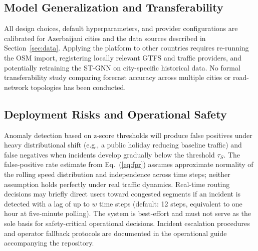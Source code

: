 \subsection{Model Generalization and Transferability}

All design choices, default hyperparameters, and provider configurations
are calibrated for Azerbaijani cities and the data sources described in
Section~\ref{sec:data}.
Applying the platform to other countries requires re-running the OSM
import, registering locally relevant GTFS and traffic providers, and
potentially retraining the ST-GNN on city-specific historical data.
No formal transferability study comparing forecast accuracy across
multiple cities or road-network topologies has been conducted.

\subsection{Deployment Risks and Operational Safety}

Anomaly detection based on z-score thresholds will produce false positives
under heavy distributional shift (e.g., a public holiday reducing baseline
traffic) and false negatives when incidents develop gradually below the
threshold $\tau_S$.
The false-positive rate estimate from Eq.~(\ref{eq:fpr}) assumes approximate
normality of the rolling speed distribution and independence across time
steps; neither assumption holds perfectly under real traffic dynamics.
Real-time routing decisions may briefly direct users toward congested
segments if an incident is detected with a lag of up to $w$ time steps
(default: 12 steps, equivalent to one hour at five-minute polling).
The system is best-effort and must not serve as the sole basis for
safety-critical operational decisions.
Incident escalation procedures and operator fallback protocols are
documented in the operational guide accompanying the repository.
